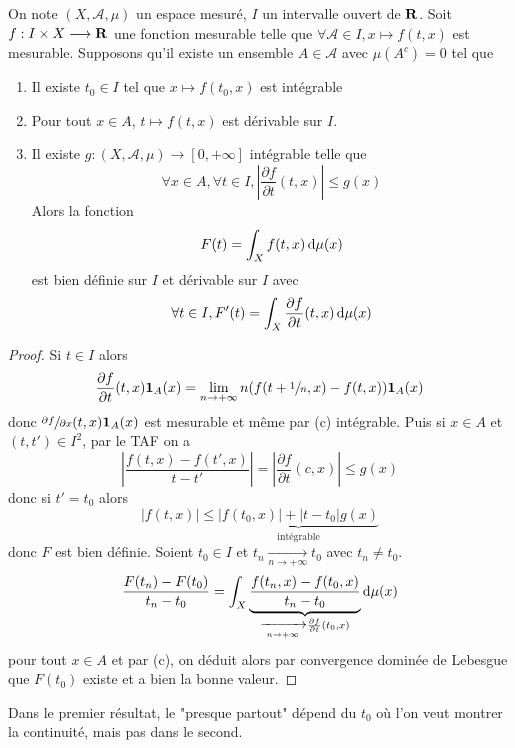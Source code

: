 \begin{thm}
    On note $(X, \mathcal  A, \mu)$ un espace mesuré, $I$ un intervalle ouvert de  $\mathbf R$. Soit $f:I\times X \longrightarrow \mathbf R$ une fonction mesurable telle que $\forall  \mathcal  A \in I, x \longmapsto f(t, x)$ est mesurable. Supposons qu'il existe un ensemble $A \in  \mathcal  A$ avec $\mu(A^c)=0$ tel que  \begin{enumerate}[label=(\alph*)]
        \item Il existe $t_0 \in  I$ tel que $x\longmapsto f(t_0, x)$ est intégrable
        \item Pour tout $x \in  A$, $t \longmapsto f(t, x)$ est dérivable sur $I$.
        \item Il existe  $g:(X, \mathcal  A,  \mu)\longrightarrow [0, +\infty]$ intégrable telle que \[
                \forall  x \in  A, \forall  t \in  I, \left| \frac{\partial f}{\partial t}(t, x) \right|\leq g(x)
        \] 
        Alors la fonction \[
            F(t)=\int_Xf(t, x)\mathop{}\!\mathrm d\mu(x)
        \] 
        est bien définie sur $I$ et dérivable sur  $I$ avec  \[
            \forall  t \in  I, F'(t)=\int_X \frac{\partial f}{\partial t}(t, x)\mathop{}\!\mathrm d\mu(x)
        \] 
    \end{enumerate}
\end{thm}

\begin{proof}
Si $t \in  I$ alors \[
    \frac{\partial f}{\partial t}(t, x)\bm{1}_A(x)=\lim_{n\to +\infty} n(f(t+\sfrac1n, x)-f(t, x))\bm{1}_A(x)
\] 
donc $\sfrac{\partial f}{\partial x}(t, x)\bm{1}_A(x)$ est mesurable et même par (c) intégrable. Puis si $x \in  A$ et $(t, t') \in  I^2 $, par le TAF on a \[
    \left| \frac{f(t, x)-f(t', x)}{t-t'} \right|= \left| \frac{\partial f}{\partial t}(c, x) \right|\leq g(x)
\]
donc si $t'=t_0$ alors \[
    |f(t, x)|\leq \underbrace{|f(t_0, x)|+|t-t_0|g(x)}_{\text{intégrable}}
\] 
donc $F$ est bien définie. Soient  $t_0 \in  I$ et $t_n \xrightarrow[n\to+\infty]{}t_0$ avec $t_n \neq  t_0$. \[
    \frac{F(t_n)-F(t_0)}{t_n-t_0}=\int_X\underbrace{\frac{f(t_n, x)-f(t_0,x)}{t_n-t_0}}_{\xrightarrow[n\to+\infty]{}\frac{\partial f}{\partial t}(t_0, x)}\mathop{}\!\mathrm d\mu(x)
\]
pour tout $x \in  A$ et par (c), on déduit alors par convergence dominée de Lebesgue que $F(t_0)$ existe et a bien la bonne valeur.
\end{proof}

\begin{rem}
Dans le premier résultat, le "presque partout" dépend du $t_0$ où l'on veut montrer la continuité, mais pas dans le second.
\end{rem}

